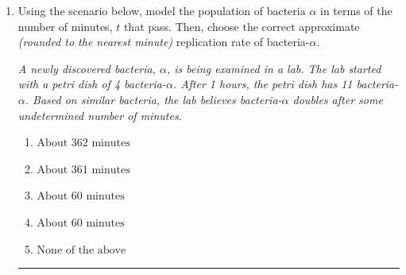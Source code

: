 \documentclass[14pt]{extbook}
\newcommand{\litem}[1]{\item#1\hspace*{-1cm}\rule{\textwidth}{0.4pt}}
\begin{document}
\begin{enumerate}
{\begin{enumerate}[label=\Alph*.]
\end{enumerate} }
\litem{
Using the scenario below, model the population of bacteria $\alpha$ in terms of the number of minutes, $t$ that pass. Then, choose the correct approximate \textit{(rounded to the nearest minute)} replication rate of bacteria-$\alpha$.
\begin{center}
    \textit{ A newly discovered bacteria, $\alpha$, is being examined in a lab. The lab started with a petri dish of 4 bacteria-$\alpha$. After 1 hours, the petri dish has 11 bacteria-$\alpha$. Based on similar bacteria, the lab believes bacteria-$\alpha$ doubles after some undetermined number of minutes. }
\end{center}
\begin{enumerate}[label=\Alph*.]
\item \( \text{About } 362 \text{ minutes} \)
\item \( \text{About } 361 \text{ minutes} \)
\item \( \text{About } 60 \text{ minutes} \)
\item \( \text{About } 60 \text{ minutes} \)
\item \( \text{None of the above} \)

\end{enumerate} }
\end{enumerate}
\end{document}
